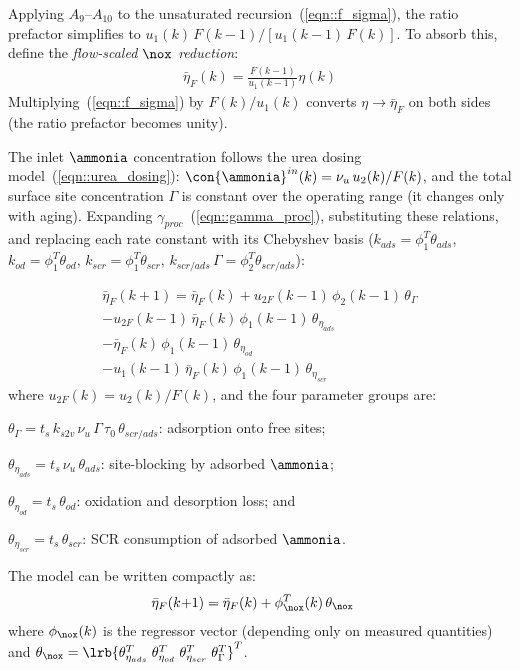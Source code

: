 Applying $A_9$--$A_{10}$ to the unsaturated recursion~(\ref{eqn::f_sigma}), the ratio prefactor simplifies to
$u_1(k)\, F(k{-}1) / [u_1(k{-}1)\, F(k)]$. To absorb this, define the \textit{flow-scaled $\nox$ reduction}:
\begin{align}
    \bar \eta_F (k) = \frac{F(k{-}1)}{u_1(k{-}1)} \eta(k)
    \label{eqn::eta_bar_def}
\end{align}
Multiplying~(\ref{eqn::f_sigma}) by $F(k)/u_1(k)$ converts $\eta \to \bar\eta_F$ on both sides (the ratio prefactor
becomes unity).

The inlet $\ammonia$ concentration follows the urea dosing model~(\ref{eqn::urea_dosing}): $\con{\ammonia}^{in}(k) =
\nu_u\, u_2(k)/F(k)$, and the total surface site concentration $\Gamma$ is constant over the operating range (it changes
only with aging). Expanding $\gamma_{proc}$~(\ref{eqn::gamma_proc}), substituting these relations, and replacing each
rate constant with its Chebyshev basis ($k_{ads} = \phi_1^T\theta_{ads}$, $k_{od} = \phi_1^T\theta_{od}$, $k_{scr} =
\phi_1^T\theta_{scr}$, $k_{scr/ads}\,\Gamma = \phi_2^T\theta_{scr/ads}$):

\begin{multline}
    \bar \eta_F (k{+}1) = \bar \eta_F (k) + u_{2F}(k{-}1)\,\phi_2(k{-}1)\, \theta_\Gamma \\
        - u_{2F}(k{-}1)\, \bar \eta_F (k)\, \phi_1(k{-}1)\, \theta_{\eta_{ads}} \\
        - \bar \eta_F (k)\, \phi_1(k{-}1)\, \theta_{\eta_{od}} \\
        - u_1(k{-}1)\, \bar \eta_F (k)\, \phi_1(k{-}1)\, \theta_{\eta_{scr}}
    \label{eqn::eta_bar_dynamics}
\end{multline}
where $u_{2F}(k) = u_2(k)/F(k)$, and the four parameter groups are:
\begin{inparaenum}[(1)]
    \item $\theta_\Gamma = t_s\, k_{s2v}\, \nu_u\, \Gamma\, \tau_0\, \theta_{scr/ads}$:
        adsorption onto free sites;
    \item $\theta_{\eta_{ads}} = t_s\, \nu_u\, \theta_{ads}$:
        site-blocking by adsorbed $\ammonia$;
    \item $\theta_{\eta_{od}} = t_s\, \theta_{od}$:
        oxidation and desorption loss; and
    \item $\theta_{\eta_{scr}} = t_s\, \theta_{scr}$:
        SCR consumption of adsorbed $\ammonia$.
\end{inparaenum}

The model can be written compactly as:
\begin{align}
    \bar \eta_F (k{+}1) &= \bar \eta_F (k) + \phi_{\nox}^T(k)\, \theta_{\nox}
    \label{eqn::eta_compact}
\end{align}
where $\phi_{\nox}(k)$ is the regressor vector (depending only on measured quantities) and
$\theta_{\nox} = \lrb{\theta_{\eta_{ads}}^T \; \theta_{\eta_{od}}^T \; \theta_{\eta_{scr}}^T \;
\theta_\Gamma^T}^T$.

